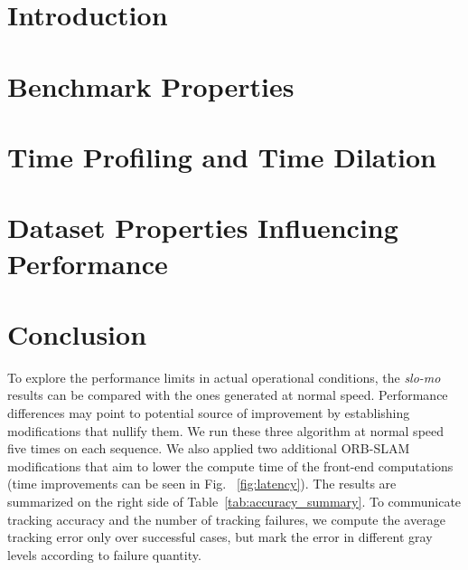 \section{Introduction}



\section{Benchmark Properties}
\label{sec:bench}


\section{Time Profiling and Time Dilation}
\label{sec:timing}


\section{Dataset Properties Influencing Performance}
\label{sec:eval}


\section{Conclusion}



\balance 






To explore the performance limits in actual operational conditions, the
\textit{slo-mo} results can be compared with the ones generated at
normal speed. Performance differences may point to potential source of
improvement by establishing modifications that nullify them.
We run these three algorithm at normal speed five times on each sequence.
We also applied two additional ORB-SLAM modifications that aim to lower
the compute time of the front-end computations 
\cite{zhao2018good2,zhao2019maphash} (time improvements can be seen in
Fig.~ \ref{fig:latency}).  The results are summarized on the right side of 
Table~\ref{tab:accuracy_summary}. 
To communicate tracking accuracy and the number of tracking failures, 
we compute the average tracking error only over successful cases, but 
mark the error in different gray levels according to failure quantity. 

